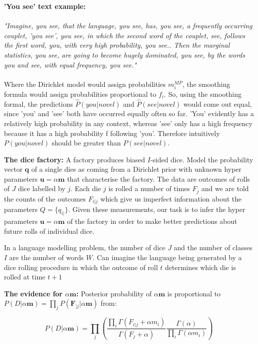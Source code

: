 \textbf{'You see' text example: } 
\\ \\
\noindent \textit{"Imagine, you see, that the language, you see, has, you see, a frequently occurring couplet, 'you see', you see, in which the second word of the couplet, see, follows the first word, you, with very high probability, you see.. Then the marginal statistics, you see, are going to become hugely dominated, you see, by the words you and see, with equal frequency, you see."}
\\ \\
\indent Where the Dirichlet model would assign probabilities $m_{i}^{MP}$, the smoothing formula would assign probabilities proportional to $f_{i}$. So, using the smoothing formal, the predictions $\hat{P}(you|novel)$ and $\hat{P}(see|novel)$ would come out equal, since 'you' and 'see' both have occurred equally often so far. 'You' evidently has a relatively high probability in any context, whereas 'see' only has a high frequency because it has a high probability f following 'you'. Therefore intuitively $P(you|novel)$ should be greater than $P(see|novel)$.

\textbf{The dice factory: } A factory produces biased $I$-sided dice. Model the probability vector $\boldsymbol{q}$ of a single dies as coming from a Dirichlet prior with unknown hyper parameters $\boldsymbol{u}=\alpha\boldsymbol{m}$ that characterise the factory. The data are outcomes of rolls of $J$ dice labelled by $j$. Each die $j$ is rolled a number of times $F_{j}$ and we are told the counts of the outcomes $F_{i|j}$ which give us imperfect information about the parameters $Q=\{q_{i|}\}$. Given these measurements, our task is to infer the hyper parameters $\boldsymbol{u}=\alpha\boldsymbol{m}$ of the factory in order to make better predictions about future rolls of individual dice.

In a language modelling problem, the number of dice $J$ and the number of classes $I$ are the number of words $W$. Can imagine the language being generated by a dice rolling procedure in which the outcome of roll $t$ determines which die is rolled at time $t+1$

\textbf{The evidence for $\alpha\boldsymbol{m}$: } Posterior probability of $\alpha\boldsymbol{m}$ is proportional to $P(D|\alpha\boldsymbol{m})=\prod_{j}P(\boldsymbol{F}_{|j}|\alpha\boldsymbol{m})$ from:

\begin{equation}
P(D|\alpha\boldsymbol{m})=\prod_{j}\left(\frac{\prod_{i}\Gamma(F_{i|j}+\alpha m_{i})}{\Gamma(F_{j}+\alpha)}\frac{\Gamma(\alpha)}{\prod_{i}\Gamma(\alpha m_{i})}\right)
\end{equation}

